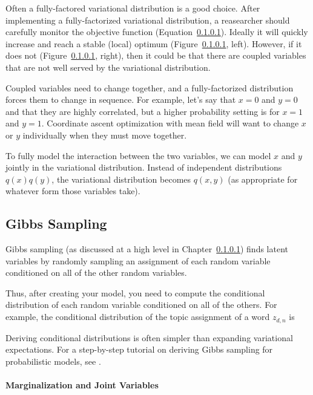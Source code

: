 Often a fully-factored variational distribution is a good choice.
After implementing a fully-factorized variational distribution, a
reasearcher should carefully monitor the objective function (Equation~\ref{}).  Ideally
it will quickly increase and reach a stable (local) optimum
(Figure~\ref{}, left).  However,
if it does not (Figure~\ref{}, right), then it could be that there are
coupled variables that are not well served by the variational
distribution.

Coupled variables need to change together, and a fully-factorized
distribution forces them to change in sequence.  For example, let's
say that $x=0$ and $y=0$ and that they are highly correlated, but a
higher probability setting is for $x=1$ and $y=1$.  Coordinate ascent
optimization with mean field will want to change $x$ or $y$
individually when they must move together.

To fully model the interaction between the two variables, we can model
$x$ and $y$ jointly in the variational distribution.  Instead of
independent distributions $q(x)q(y)$, the variational distribution
becomes $q(x,y)$ (as appropriate for whatever form those variables take).

\subsection{Gibbs Sampling}

Gibbs sampling (as discussed at a high level in Chapter~\ref{}) finds
latent variables by randomly sampling an assignment of each random
variable conditioned on all of the other random variables.

Thus, after creating your model, you need to compute the conditional
distribution of each random variable conditioned on all of the
others.  For example, the conditional distribution of the topic
assignment of a word $z_{d,n}$ is
\begin{equation}

\end{equation}

Deriving conditional distributions is often simpler than expanding
variational expectations.  For a step-by-step tutorial on deriving
Gibbs sampling for probabilistic models, see \citet{}.

\paragraph{Marginalization and Joint Variables}

